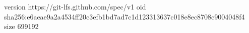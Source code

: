 version https://git-lfs.github.com/spec/v1
oid sha256:e6aeae9a2a4534ff20c3efb1bd7ad7c1d123313637c018e8ec8708c9004048f4
size 699192
